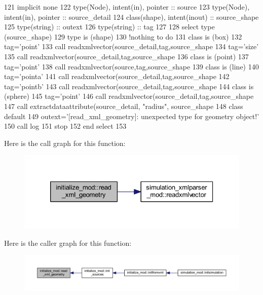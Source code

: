 \begin{DoxyCode}
121     \textcolor{keywordtype}{implicit none}
122     \textcolor{keywordtype}{type}(Node), \textcolor{keywordtype}{intent(in)}, \textcolor{keywordtype}{pointer} :: source
123     \textcolor{keywordtype}{type}(Node), \textcolor{keywordtype}{intent(in)}, \textcolor{keywordtype}{pointer} :: source\_detail
124     \textcolor{keywordtype}{class}(shape), \textcolor{keywordtype}{intent(inout)} :: source\_shape
125     \textcolor{keywordtype}{type}(string) :: outext
126     \textcolor{keywordtype}{type}(string) :: tag
127 
128     \textcolor{keywordflow}{select type} (source\_shape)
129 \textcolor{keywordflow}{    type is} (shape)
130         \textcolor{comment}{!nothing to do}
131 \textcolor{keywordflow}{    class is} (box)
132         tag=\textcolor{stringliteral}{'point'}
133         \textcolor{keyword}{call }readxmlvector(source\_detail,tag,source\_shape%
134         tag=\textcolor{stringliteral}{'size'}
135         \textcolor{keyword}{call }readxmlvector(source\_detail,tag,source\_shape%
136 \textcolor{keywordflow}{    class is} (point)
137         tag=\textcolor{stringliteral}{'point'}
138         \textcolor{keyword}{call }readxmlvector(source,tag,source\_shape%
139 \textcolor{keywordflow}{    class is} (line)
140         tag=\textcolor{stringliteral}{'pointa'}
141         \textcolor{keyword}{call }readxmlvector(source\_detail,tag,source\_shape%
142         tag=\textcolor{stringliteral}{'pointb'}
143         \textcolor{keyword}{call }readxmlvector(source\_detail,tag,source\_shape%
144 \textcolor{keywordflow}{    class is} (sphere)
145         tag=\textcolor{stringliteral}{'point'}
146         \textcolor{keyword}{call }readxmlvector(source\_detail,tag,source\_shape%
147         \textcolor{keyword}{call }extractdataattribute(source\_detail, \textcolor{stringliteral}{"radius"}, source\_shape%
148 \textcolor{keywordflow}{        class default}
149         outext=\textcolor{stringliteral}{'[read\_xml\_geometry]: unexpected type for geometry object!'}
150         \textcolor{keyword}{call }log%
151         stop
152 \textcolor{keywordflow}{    end select}
153 
\end{DoxyCode}
Here is the call graph for this function\+:\nopagebreak
\begin{figure}[H]
\begin{center}
\leavevmode
\includegraphics[width=326pt]{namespaceinitialize__mod_aebe8236f74bc6665b16463683c478602_cgraph}
\end{center}
\end{figure}
Here is the caller graph for this function\+:\nopagebreak
\begin{figure}[H]
\begin{center}
\leavevmode
\includegraphics[width=350pt]{namespaceinitialize__mod_aebe8236f74bc6665b16463683c478602_icgraph}
\end{center}
\end{figure}
